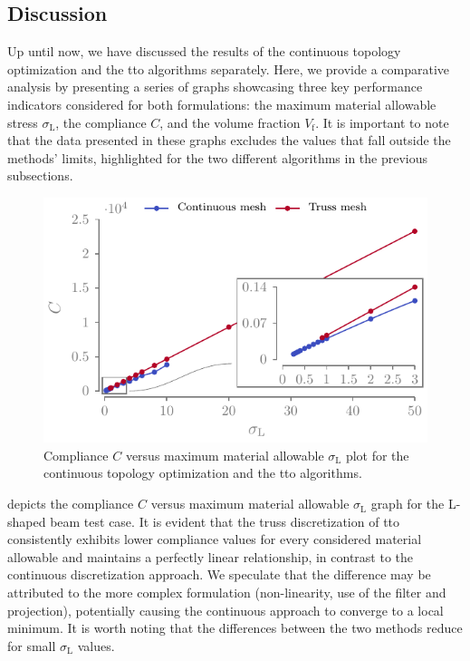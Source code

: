 \subsection{Discussion}
Up until now, we have discussed the results of the continuous topology optimization and the \gls{tto} algorithms separately. Here, we provide a comparative analysis by presenting a series of graphs showcasing three key performance indicators considered for both formulations: the maximum material allowable stress $\sigma_\text{L}$, the compliance $C$, and the volume fraction $V_\text{f}$. It is important to note that the data presented in these graphs excludes the values that fall outside the methods' limits, highlighted for the two different algorithms in the previous subsections.
\begin{figure}
    \centering
    \includegraphics{figures/03_comparison_TO_TTO/14_stress_comp/stress_comp.pdf}
    \caption{Compliance $C$ versus maximum material allowable $\sigma_\text{L}$ plot for the continuous topology optimization and the \gls{tto} algorithms.}
    \label{fig:03_stress_comp}
\end{figure}

 depicts the compliance $C$ versus maximum material allowable $\sigma_\text{L}$ graph for the L-shaped beam test case. It is evident that the truss discretization of \gls{tto} consistently exhibits lower compliance values for every considered material allowable and maintains a perfectly linear relationship, in contrast to the continuous discretization approach. We speculate that the difference may be attributed to the more complex formulation (non-linearity, use of the filter and projection), potentially causing the continuous approach to converge to a local minimum. It is worth noting that the differences between the two methods reduce for small $\sigma_\text{L}$ values.

